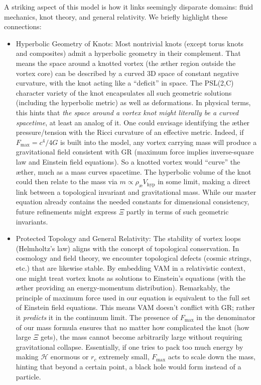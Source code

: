 A striking aspect of this model is how it links seemingly disparate domains: fluid mechanics, knot theory, and general relativity. We briefly highlight these connections:\begin{itemize}

\item
Hyperbolic Geometry of Knots: Most nontrivial knots (except torus knots and composites) admit a hyperbolic geometry in their complement. That means the space around a knotted vortex (the æther region outside the vortex core) can be described by a curved 3D space of constant negative curvature, with the knot acting like a “deficit” in space. The PSL(2,C) character variety of the knot encapsulates all such geometric solutions (including the hyperbolic metric) as well as deformations. In physical terms, this hints that \textit{the space around a vortex knot might literally be a curved spacetime}, at least an analog of it. One could envisage identifying the æther pressure/tension with the Ricci curvature of an effective metric. Indeed, if $F_{\max}=c^4/4G$ is built into the model, any vortex carrying mass will produce a gravitational field consistent with GR (maximum force implies inverse-square law and Einstein field equations). So a knotted vortex would “curve” the æther, much as a mass curves spacetime. The hyperbolic volume of the knot could then relate to the mass via $m \propto \rho_{\text{\ae}} V_{\text{hyp}}$ in some limit, making a direct link between a topological invariant and gravitational mass. While our master equation already contains the needed constants for dimensional consistency, future refinements might express $\Xi$ partly in terms of such geometric invariants.

\item
Protected Topology and General Relativity: The stability of vortex loops (Helmholtz’s law) aligns with the concept of topological conservation. In cosmology and field theory, we encounter topological defects (cosmic strings, etc.) that are likewise stable. By embedding VAM in a relativistic context, one might treat vortex knots as solutions to Einstein’s equations (with the æther providing an energy-momentum distribution). Remarkably, the principle of maximum force used in our equation is equivalent to the full set of Einstein field equations. This means VAM doesn’t conflict with GR; rather it \textit{predicts} it in the continuum limit. The presence of $F_{\max}$ in the denominator of our mass formula ensures that no matter how complicated the knot (how large $\Xi$ gets), the mass cannot become arbitrarily large without requiring gravitational collapse. Essentially, if one tries to pack too much energy by making $\mathcal{H}$ enormous or $r_c$ extremely small, $F_{\max}$ acts to scale down the mass, hinting that beyond a certain point, a black hole would form instead of a particle.


\end{itemize}
